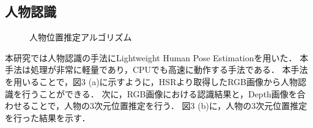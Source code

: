 \documentclass[a4j]{jarticle}
\begin{document}
\subsection{人物認識}
\begin{figure}[t]
  \centering
  \caption{人物位置推定アルゴリズム}
  \label{human_estimation_explain}
\end{figure}
本研究では人物認識の手法にLightweight Human Pose Estimation\cite{light-openpose}を用いた．
本手法は処理が非常に軽量であり，CPUでも高速に動作する手法である．
本手法を用いることで，図3 (a)に示すように，HSRより取得したRGB画像から人物認識を行うことができる．
次に，RGB画像における認識結果と，Depth画像を合わせることで，人物の3次元位置推定を行う．
図3 (b)に，人物の3次元位置推定を行った結果を示す．
\end{document}
